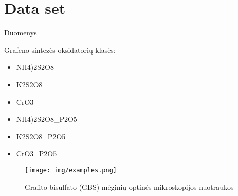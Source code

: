 \section{Data set}

\begin{frame}[c]{Duomenys}
    \begin{minipage}{0.45\textwidth}
    Grafeno sintezės oksidatorių klasės:
        \begin{itemize}
            \item NH4)2S2O8
            \item K2S2O8
            \item CrO3
            \item NH4)2S2O8\_P2O5
            \item K2S2O8\_P2O5
            \item CrO3\_P2O5
        \end{itemize}
    \end{minipage}
    \begin{minipage}{0.5\textwidth}
        \begin{figure}
            \centering
            \texttt{[image: img/examples.png]}
            \caption{Grafito bisulfato (GBS) mėginių optinės mikroskopijos nuotraukos}
            \label{fig:graphene_data}
        \end{figure}
    \end{minipage}
\end{frame}
